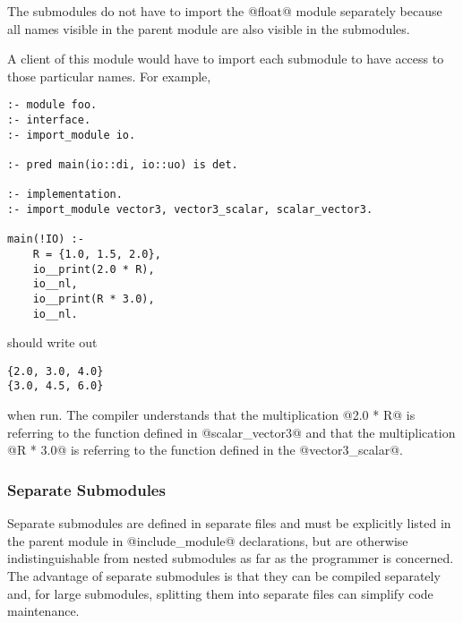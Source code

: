 The submodules do not have to import the @float@ module separately
because all names visible in the parent module are also visible in the
submodules.

A client of this module would have to import each submodule to have
access to those particular names.  For example,
\begin{verbatim}
:- module foo.
:- interface.
:- import_module io.

:- pred main(io::di, io::uo) is det.

:- implementation.
:- import_module vector3, vector3_scalar, scalar_vector3.

main(!IO) :-
    R = {1.0, 1.5, 2.0},
    io__print(2.0 * R),
    io__nl,
    io__print(R * 3.0),
    io__nl.
\end{verbatim}
should write out
\begin{verbatim}
{2.0, 3.0, 4.0}
{3.0, 4.5, 6.0}
\end{verbatim}
when run.  The compiler understands that the multiplication @2.0 * R@
is referring to the function defined in @scalar_vector3@ and that the
multiplication @R * 3.0@ is referring to the function defined in the
@vector3_scalar@.

\subsubsection{Separate Submodules}

Separate submodules are defined in separate files and must be explicitly
listed in the parent module in @include_module@ declarations, but are 
otherwise indistinguishable from nested submodules as far as the
programmer is concerned.  The advantage of separate submodules is that
they can be compiled separately  and, for
large submodules, splitting them into separate files can simplify code
maintenance.



